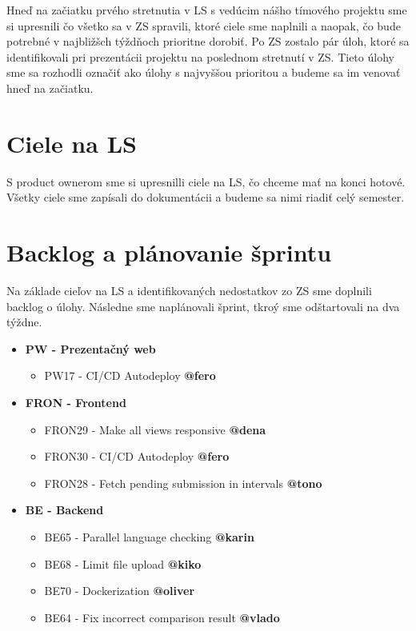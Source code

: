 \documentclass{article}
\begin{document}
        \textnormal {Hneď na začiatku prvého stretnutia v LS s vedúcim nášho tímového projektu sme si upresnili čo všetko sa v ZS spravili, ktoré ciele sme naplnili a naopak, čo bude potrebné v najbližšch týždňoch prioritne dorobiť. }
        \textnormal {Po ZS zostalo pár úloh, ktoré sa identifikovali pri prezentácii projektu na poslednom stretnutí v ZS. Tieto úlohy sme sa rozhodli označiť ako úlohy s najvyššou prioritou a budeme sa im venovať hneď na začiatku. }

    \section*{Ciele na LS}

        \textnormal {S product ownerom sme si upresnilli ciele na LS, čo chceme mať na konci hotové. Všetky ciele sme zapísali do dokumentácii a budeme sa nimi riadiť celý semester.}

    \section*{Backlog a plánovanie šprintu}
        \textnormal {Na základe cieľov na LS a identifikovaných nedostatkov zo ZS sme doplnili backlog o úlohy. Následne sme naplánovali šprint, tkroý sme odštartovali na dva týždne. }

    \begin{itemize}
    \item \textbf {PW - Prezentačný web} 
        \begin{itemize}
            \item PW17 - CI/CD Autodeploy \textbf {@fero}
        \end{itemize}
    \item \textbf {FRON - Frontend} 
        \begin{itemize}
            \item FRON29 - Make all views responsive \textbf {@dena}
            \item FRON30 - CI/CD Autodeploy \textbf {@fero}
            \item FRON28 - Fetch pending submission in intervals \textbf {@tono}
        \end{itemize}  
    \item \textbf {BE - Backend} 
        \begin{itemize}
            \item BE65 - Parallel language checking \textbf {@karin}
            \item BE68 - Limit file upload \textbf {@kiko}
            \item BE70 - Dockerization \textbf {@oliver}
            \item BE64 - Fix incorrect comparison result \textbf {@vlado}
        \end{itemize}        
    \end{itemize}
\end{document}
